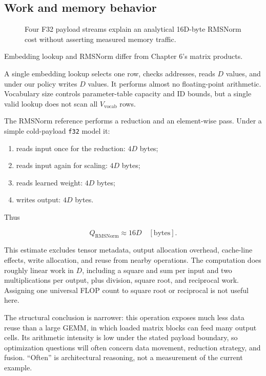 \documentclass[
  10pt,
]{article}
\providecommand{\tightlist}{%
  \setlength{\itemsep}{0pt}\setlength{\parskip}{0pt}}
\begin{document}
\subsection{Work and memory behavior}\label{work-and-memory-behavior}

\begin{figure}[H]\centering\resizebox{\linewidth}{!}{}\caption{Four F32 payload streams explain an analytical 16D-byte RMSNorm cost without asserting measured memory traffic.}\end{figure}

Embedding lookup and RMSNorm differ from Chapter 6's matrix products.

A single embedding lookup selects one row, checks addresses, reads \(D\)
values, and under our policy writes \(D\) values. It performs almost no
floating-point arithmetic. Vocabulary size controls parameter-table
capacity and ID bounds, but a single valid lookup does not scan all
\(V_{\mathrm{vocab}}\) rows.

The RMSNorm reference performs a reduction and an element-wise pass.
Under a simple cold-payload \texttt{f32} model it:

\begin{enumerate}
\def\labelenumi{\arabic{enumi}.}
\tightlist
\item
  reads input once for the reduction: \(4D\) bytes;
\item
  reads input again for scaling: \(4D\) bytes;
\item
  reads learned weight: \(4D\) bytes;
\item
  writes output: \(4D\) bytes.
\end{enumerate}

Thus

\[
Q_{\mathrm{RMSNorm}}\approx16D\quad[\mathrm{bytes}].
\]

This estimate excludes tensor metadata, output allocation overhead,
cache-line effects, write allocation, and reuse from nearby operations.
The computation does roughly linear work in \(D\), including a square
and sum per input and two multiplications per output, plus division,
square root, and reciprocal work. Assigning one universal FLOP count to
square root or reciprocal is not useful here.

The structural conclusion is narrower: this operation exposes much less
data reuse than a large GEMM, in which loaded matrix blocks can feed
many output cells. Its arithmetic intensity is low under the stated
payload boundary, so optimization questions will often concern data
movement, reduction strategy, and fusion. ``Often'' is architectural
reasoning, not a measurement of the current example.
\end{document}
